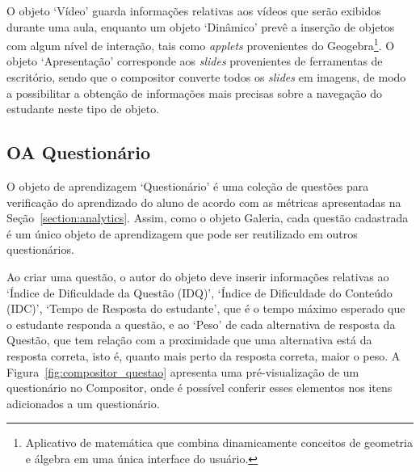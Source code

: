O objeto `Vídeo' guarda informações relativas aos vídeos que serão exibidos durante uma aula, enquanto um objeto `Dinâmico' prevê a inserção de objetos com algum nível de interação, tais como \textit{applets} provenientes do Geogebra\footnote{Aplicativo de matemática que combina dinamicamente conceitos de geometria e álgebra em uma única interface do usuário.}. O objeto `Apresentação' corresponde aos \textit{slides} provenientes de ferramentas de escritório, sendo que o compositor converte todos os \textit{slides} em imagens, de modo a possibilitar a obtenção de informações mais precisas sobre a navegação do estudante neste tipo de objeto.



\subsection{OA Questionário}\label{section:OAquestionario}

O objeto de aprendizagem `Questionário' é uma coleção de questões para verificação do aprendizado do aluno de acordo com as métricas apresentadas na Seção~\ref{section:analytics}. Assim, como o objeto Galeria, cada questão cadastrada é um único objeto de aprendizagem que pode ser reutilizado em outros questionários.

Ao criar uma questão, o autor do objeto deve inserir informações relativas ao `Índice de Dificuldade da Questão (IDQ)', `Índice de Dificuldade do Conteúdo (IDC)', `Tempo de Resposta do estudante', que é o tempo máximo esperado que o estudante responda a questão, e ao `Peso' de cada alternativa de resposta da Questão, que tem relação com a proximidade que uma alternativa está da resposta correta, isto é, quanto mais perto da resposta correta, maior o peso. 
A Figura~\ref{fig:compositor_questao} apresenta uma pré-visualização de um questionário no Compositor, onde é possível conferir esses elementos nos itens adicionados a um questionário.

